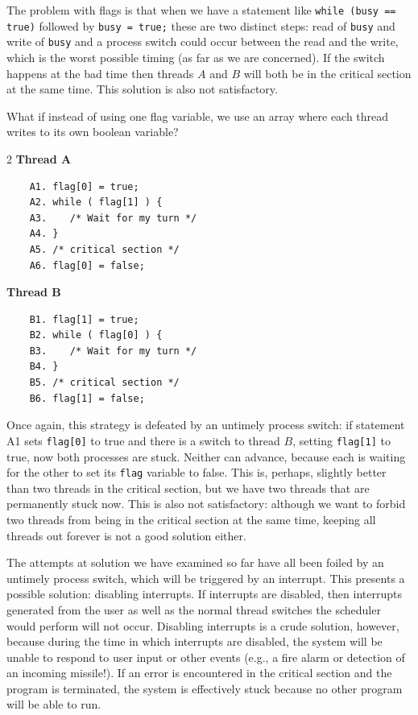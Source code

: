 The problem with flags is that when we have a statement like \texttt{while (busy == true)} followed by \texttt{busy = true;} these are two distinct steps: read of \texttt{busy} and write of \texttt{busy} and a process switch could occur between the read and the write, which is the worst possible timing (as far as we are concerned). If the switch happens at the bad time then threads $A$ and $B$ will both be in the critical section at the same time. This solution is also not satisfactory.

What if instead of using one flag variable, we use an array where each thread writes to its own boolean variable?

\begin{multicols}{2}
	\textbf{Thread A}\vspace{-2em}
	\begin{verbatim}
	A1. flag[0] = true;
	A2. while ( flag[1] ) {
	A3.    /* Wait for my turn */
	A4. }
	A5. /* critical section */
	A6. flag[0] = false;
	\end{verbatim}
	\columnbreak
	\textbf{Thread B}\vspace{-2em}
	\begin{verbatim}
	B1. flag[1] = true;
	B2. while ( flag[0] ) {
	B3.    /* Wait for my turn */
	B4. }
	B5. /* critical section */
	B6. flag[1] = false;
	\end{verbatim}
\end{multicols}

Once again, this strategy is defeated by an untimely process switch: if statement A1 sets \texttt{flag[0]} to true and there is a switch to thread $B$, setting \texttt{flag[1]} to true, now both processes are stuck. Neither can advance, because each is waiting for the other to set its \texttt{flag} variable to false. This is, perhaps, slightly better than two threads in the critical section, but we have two threads that are permanently stuck now. This is also not satisfactory: although we want to forbid two threads from being in the critical section at the same time, keeping all threads out forever is not a good solution either.

The attempts at solution we have examined so far have all been foiled by an untimely process switch, which will be triggered by an interrupt. This presents a possible solution: disabling interrupts. If interrupts are disabled, then interrupts generated from the user as well as the normal thread switches the scheduler would perform will not occur. Disabling interrupts is a crude solution, however, because during the time in which interrupts are disabled, the system will be unable to respond to user input or other events (e.g., a fire alarm or detection of an incoming missile!). If an error is encountered in the critical section and the program is terminated, the system is effectively stuck because no other program will be able to run.

